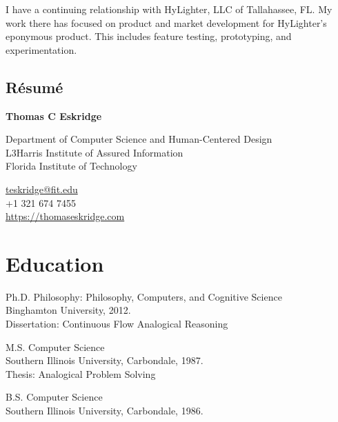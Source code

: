 \documentclass[12pt,letterpaper]{report}
\newcommand{\myname}{Thomas C Eskridge}
\newcommand{\namefont}[1]{{\normalfont\bfseries\Huge{#1}}}
\begin{document}
I have a continuing relationship with HyLighter, LLC of Tallahassee, FL.  My work there has focused on product and market development for HyLighter's eponymous product.   This includes feature testing, prototyping, and experimentation.  

\vspace{1in}

\subsection*{Résumé} \newpage


\newpage
\newpage
    \namefont{\myname}

    \vspace{1em}
    \begin{minipage}[t]{0.700\textwidth}
        Department of Computer Science and Human-Centered Design \\
        L3Harris Institute of Assured Information \\
        Florida Institute of Technology
    \end{minipage}
    \begin{minipage}[t]{0.295\textwidth}
        \flushright{}
        \href{mailto:teskridge@fit.edu}{teskridge@fit.edu} \\
        +1 321 674 7455 \\
        \href{https://thomaseskridge.com}{https://thomaseskridge.com}
    \end{minipage}


    \section*{Education}

    \begin{tablist}

        \item[Ph.D.] \tab{}Philosophy: Philosophy, Computers, and Cognitive Science \\Binghamton University, 2012. \\
                            Dissertation: Continuous Flow Analogical Reasoning
        \item[M.S.]  \tab{}Computer Science \\Southern Illinois University, Carbondale,  1987. \\
			 Thesis: Analogical Problem Solving
        \item[B.S.]  \tab{}Computer Science \\Southern Illinois University, Carbondale,  1986.


    \end{tablist}
\end{document}
